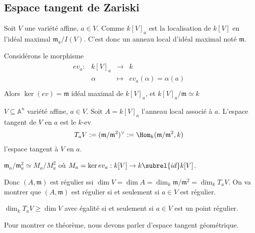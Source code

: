         \subsection{Espace tangent de Zariski}
            Soit $V$ une variété affine, $a \in V$. Comme $k[V]_a$ est la localisation de $k[V]$ en l'idéal maximal $\mathfrak{m}_a/I(V)$. C'est donc un anneau local d'idéal maximal noté 
            $\mathfrak{m}$.
            \begin{exo}
                Considérons le morphisme
                \begin{align*}
                    \begin{array}{cccc}
                        ev_a : & k[V]_a & \to & k \\
                        & \alpha & \mapsto & ev_a(\alpha) = \alpha(a) \\
                    \end{array}
                \end{align*}
                Alors $\ker(ev) = \mathfrak{m}$ idéal maximal de $k[V]_a$, et $k[V]_a/\mathfrak{m} \simeq k$
            \end{exo}
            \begin{defi}
                $V \subseteq \mathbb{A}^n$ variété affine, $a \in V$. Soit $A = k[V]_a$ l'anneau local associé à $a$. L'espace tangent de $V$ en $a$ est le $k$-ev
                \begin{align*}
                    T_aV := (\mathfrak{m}/ \mathfrak{m}^2)^{\vee} := \Hom_k(\mathfrak{m}/ \mathfrak{m}^2, k)
                \end{align*}
                l'espace tangent à $V$ en $a$.
            \end{defi}
            \begin{remq}
                $\mathfrak{m}_a/\mathfrak{m}_a^2 \simeq M_a/M_a^2$ où $M_a = \ker ev_a : k[V] \to k \subrel{id} k[V]$.
            \end{remq}
            \begin{theo}
            \end{theo}
            Donc $(A, \mathfrak{m})$ est régulier ssi $\dim V =\dim A = \dim_k \mathfrak{m}/ \mathfrak{m}^2 = \dim_k T_aV$. On va montrer que $(A, \mathfrak{m})$ est régulier si et seulement si $a \in V$ est régulier.
            \begin{theo}
                $\dim_k T_aV \geq \dim V$ avec égalité si et seulement si $a \in V$ est un point régulier.
            \end{theo}
            Pour montrer ce théorème, nous devons parler d'espace tangent géométrique.
        

